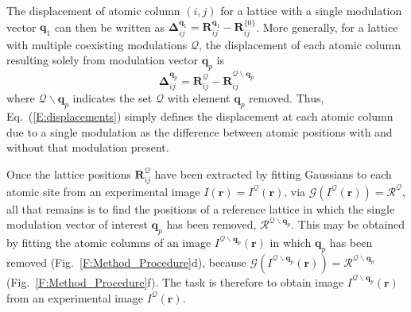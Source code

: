 \documentclass[12pt]{article}
\begin{document}
The displacement of atomic column $(i,j)$ for a lattice with a single modulation vector $\mathbf{q}_1$ can then be written as $\mathbf{\Delta}^{\mathbf{q}_1}_{ij} = \mathbf{R}_{ij}^{\mathbf{q}_1} - \mathbf{R}_{ij}^{\{0\}}$.  
More generally, for a lattice with multiple coexisting modulations $\mathcal{Q}$, the displacement of each atomic column resulting solely from modulation vector $\mathbf{q}_p$ is
\begin{equation}\label{E:displacements}
    \mathbf{\Delta}^{\mathbf{q}_p}_{ij} = \mathbf{R}_{ij}^{\mathcal{Q}} - \mathbf{R}_{ij}^{\mathcal{Q}\backslash\mathbf{q}_p}
\end{equation}
where $\mathcal{Q}\backslash\mathbf{q}_p$ indicates the set $\mathcal{Q}$ with element $\mathbf{q}_p$ removed.
Thus, Eq.~(\ref{E:displacements}) simply defines the displacement at each atomic column due to a single modulation as the difference between atomic positions with and without that modulation present.

Once the lattice positions $\mathbf{R}^\mathcal{Q}_{ij}$ have been extracted by fitting Gaussians to each atomic site from an experimental image $I(\mathbf{r}) = I^{\mathcal{Q}}(\mathbf{r})$, via $\mathcal{G}\left(I^{\mathcal{Q}}(\mathbf{r})\right) = \mathcal{R}^{\mathcal{Q}}$, all that remains is to find the positions of a reference lattice in which the single modulation vector of interest $\mathbf{q}_p$ has been removed, $\mathcal{R}^{\mathcal{Q}\backslash\mathbf{q}_p}$.
This may be obtained by fitting the atomic columns of an image $I^{\mathcal{Q}\backslash\mathbf{q}_p}(\mathbf{r})$ in which $\mathbf{q}_p$ has been removed (Fig.~\ref{F:Method_Procedure}d), because $\mathcal{G}\left(I^{\mathcal{Q}\backslash\mathbf{q}_p}(\mathbf{r})\right) = \mathcal{R}^{\mathcal{Q}\backslash\mathbf{q}_p}$ (Fig.~\ref{F:Method_Procedure}f).
The task is therefore to obtain image $I^{\mathcal{Q}\backslash\mathbf{q}_p}(\mathbf{r})$ from an experimental image $I^{\mathcal{Q}}(\mathbf{r})$. 
\end{document}
